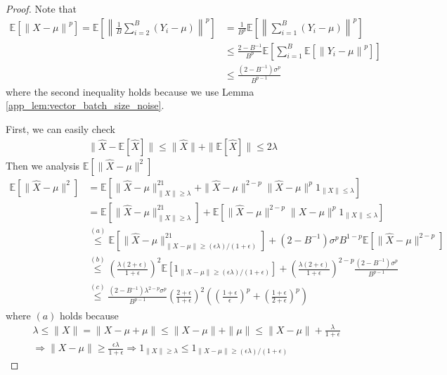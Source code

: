 \documentclass{article}
\def \E {\mathbb{E}}
\newcommand{\norm}[2][]{\left\|#2\right\|^{#1}}
\begin{document}
\begin{proof}
    Note that 
    \begin{align}
        \E[\norm[p]{X-\mu}] = \E\left[\norm[p]{\frac{1}{B}\sum_{i=2}^B(Y_i-\mu)}\right]&=\frac{1}{B^p}\E\left[\norm[p]{\sum_{i=1}^B(Y_i-\mu)}\right]\nonumber\\
        &\leq \frac{2-B^{-1}}{B^p}\E\left[\sum_{i=1}^B\E[\norm[p]{Y_i-\mu}]\right]\nonumber\\
        &\leq \frac{(2-B^{-1})\sigma^p}{B^{p-1}}
    \end{align}
    where the second inequality holds because we use Lemma \ref{app_lem:vector_batch_size_noise}.

    First, we can easily check
    \begin{align}
        \|\hat{X}-\E[\hat{X}]\|\leq \|\hat{X}\|+\|\E[\hat{X}]\| \leq 2\lambda 
    \end{align}
    Then we analysis $\E[\|\hat{X}-\mu\|^2]$
    \begin{align}
        \E[\|\hat{X}-\mu\|^2] &= \E[\|\hat{X}-\mu\|^21_{\|X\|\geq\lambda}+\|\hat{X}-\mu\|^{2-p}\|\hat{X}-\mu\|^p1_{\|X\|\leq\lambda}]\nonumber\\
        &= \E[\|\hat{X}-\mu\|^21_{\|X\|\geq\lambda}]+ \E[\|\hat{X}-\mu\|^{2-p}\|X-\mu\|^p1_{\|X\|\leq\lambda}]\nonumber\\
        &\overset{(a)}{\leq} \E[\|\hat{X}-\mu\|^21_{\|X-\mu\|\geq(\epsilon\lambda)/(1+\epsilon)}] + (2-B^{-1})\sigma^pB^{1-p}\E[\|\hat{X}-\mu\|^{2-p}]\nonumber\\
        &\overset{(b)}{\leq} \left(\frac{\lambda(2+\epsilon)}{1+\epsilon}\right)^2\E[1_{\|X-\mu\|\geq(\epsilon\lambda)/(1+\epsilon)}] + \left(\frac{\lambda(2+\epsilon)}{1+\epsilon}\right)^{2-p}\frac{(2-B^{-1})\sigma^p}{B^{p-1}}\nonumber\\
        &\overset{(c)}{\leq} \frac{(2-B^{-1})\lambda^{2-p}\sigma^p}{B^{p-1}}\left(\frac{2+\epsilon}{1+\epsilon}\right)^2 \left(\left(\frac{1+\epsilon}{\epsilon}\right)^p+\left(\frac{1+\epsilon}{2+\epsilon}\right)^p\right)
    \end{align}
    where $(a)$ holds because 
    \begin{align}
        &\lambda\leq \|X\| = \|X-\mu+\mu\| \leq \|X-\mu\|+\|\mu\|\leq \|X-\mu\|+\frac{\lambda}{1+\epsilon}\nonumber\\
        &\Longrightarrow \|X-\mu\|\geq \frac{\epsilon\lambda}{1+\epsilon}\Longrightarrow 1_{\|X\|\geq\lambda}\leq 1_{\|X-\mu\|\geq (\epsilon\lambda)/(1+\epsilon)}
    \end{align}

\end{proof}
\end{document}
